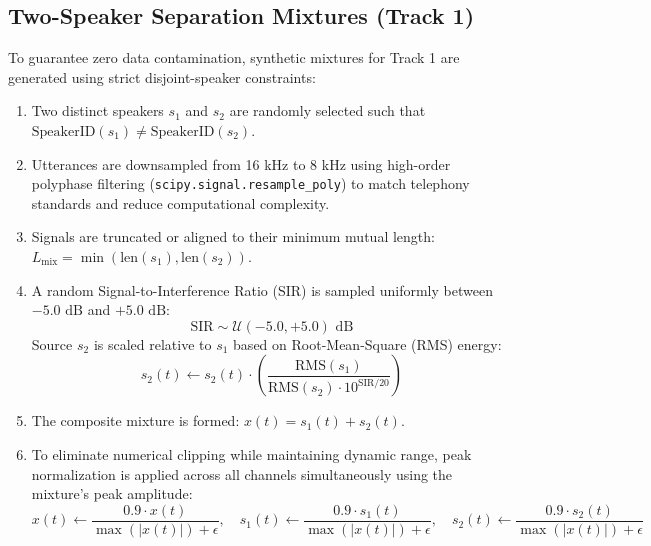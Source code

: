 \documentclass[11pt,a4paper]{report}
\begin{document}
\subsection{Two-Speaker Separation Mixtures (Track 1)}
To guarantee zero data contamination, synthetic mixtures for Track 1 are generated using strict disjoint-speaker constraints:
\begin{enumerate}
    \item Two distinct speakers $s_1$ and $s_2$ are randomly selected such that $\text{SpeakerID}(s_1) \neq \text{SpeakerID}(s_2)$.
    \item Utterances are downsampled from 16 kHz to 8 kHz using high-order polyphase filtering (\texttt{scipy.signal.resample\_poly}) to match telephony standards and reduce computational complexity.
    \item Signals are truncated or aligned to their minimum mutual length: $L_{\text{mix}} = \min(\text{len}(s_1), \text{len}(s_2))$.
    \item A random Signal-to-Interference Ratio (SIR) is sampled uniformly between $-5.0\text{ dB}$ and $+5.0\text{ dB}$:
    \begin{equation}
        \text{SIR} \sim \mathcal{U}(-5.0, +5.0)\text{ dB}
    \end{equation}
    Source $s_2$ is scaled relative to $s_1$ based on Root-Mean-Square (RMS) energy:
    \begin{equation}
        s_2(t) \leftarrow s_2(t) \cdot \left( \frac{\text{RMS}(s_1)}{\text{RMS}(s_2) \cdot 10^{\text{SIR}/20}} \right)
    \end{equation}
    \item The composite mixture is formed: $x(t) = s_1(t) + s_2(t)$.
    \item To eliminate numerical clipping while maintaining dynamic range, peak normalization is applied across all channels simultaneously using the mixture's peak amplitude:
    \begin{equation}
        x(t) \leftarrow \frac{0.9 \cdot x(t)}{\max(|x(t)|) + \epsilon}, \quad s_1(t) \leftarrow \frac{0.9 \cdot s_1(t)}{\max(|x(t)|) + \epsilon}, \quad s_2(t) \leftarrow \frac{0.9 \cdot s_2(t)}{\max(|x(t)|) + \epsilon}
    \end{equation}
\end{enumerate}
\end{document}
